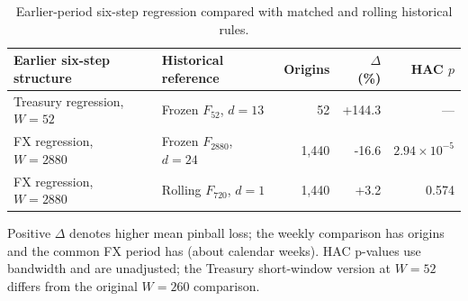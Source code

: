 \begin{table}[htbp]
\centering\small
\begin{tabular}{p{.29\linewidth}p{.27\linewidth}rrr}
\toprule
Earlier six-step structure & Historical reference & Origins & $\Delta$ (\%) & HAC $p$ \\
\midrule
Treasury regression, $W=52$ & Frozen $F_{52}$, $d=13$ & 52 & +144.3 & --- \\
FX regression, $W=2880$ & Frozen $F_{2880}$, $d=24$ & 1,440 & -16.6 & $2.94\times10^{-5}$ \\
FX regression, $W=2880$ & Rolling $F_{720}$, $d=1$ & 1,440 & +3.2 & 0.574 \\
\bottomrule
\end{tabular}
\caption{Earlier-period six-step regression compared with matched and rolling historical rules.}\label{tab:r6-primary}
\par\smallskip\begin{minipage}{\linewidth}\footnotesize Positive $\Delta$ denotes higher mean pinball loss; the weekly comparison has \RWritingWeeklyN{} origins and the common FX period has \RWritingFXN{} (about \RWritingFXWeeks{} calendar weeks). HAC p-values use bandwidth \RWritingHACL{} and are unadjusted; the Treasury short-window version at $W=52$ differs from the original $W=260$ comparison.\end{minipage}
\end{table}
